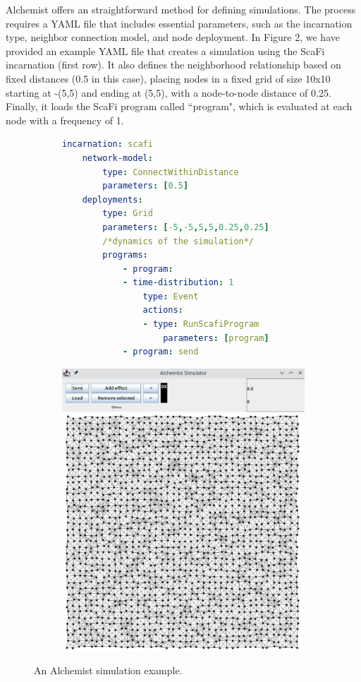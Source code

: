 \documentclass[12pt,a4paper,openright,twoside]{book}
\begin{document}
Alchemist offers an straightforward method for defining simulations. The process
    requires a YAML file that includes essential parameters, such as the incarnation
    type, neighbor connection model, and node deployment. In Figure 2, we have
    provided an example YAML file that creates a simulation using the ScaFi incarnation (first row). It also defines the neighborhood relationship based on fixed
    distances (0.5 in this case), placing nodes in a fixed grid of size 10x10 starting
    at -(5,5) and ending at (5,5), with a node-to-node distance of 0.25. Finally, it
    loads the ScaFi program called ``program", which is evaluated at each node with
    a frequency of 1.

\begin{figure}
    \centering
    \begin{subfigure}[b]{0.49\textwidth}
        \centering
        \begin{lstlisting}[language=yaml]
    incarnation: scafi
    network-model:
        type: ConnectWithinDistance
        parameters: [0.5]
    deployments:
        type: Grid
        parameters: [-5,-5,5,5,0.25,0.25]
        /*dynamics of the simulation*/
        programs: 
            - program:
            - time-distribution: 1
                type: Event
                actions: 
                - type: RunScafiProgram
                    parameters: [program]
            - program: send
    \end{lstlisting}
    \end{subfigure}
    \hfill
    \begin{subfigure}[b]{0.49\textwidth}
        \centering
        \includegraphics[width=\textwidth]{figures/alchemist.png}
    \end{subfigure}
    \caption{An Alchemist simulation example.}
    \label{fig:alchemist}
\end{figure}
\end{document}
